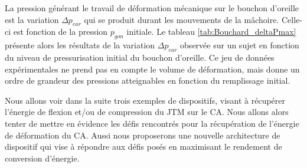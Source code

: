 La pression générant le travail de déformation mécanique sur le bouchon d'oreille est la variation $\Delta p_{ear}$ qui se produit durant les mouvements de la mâchoire. Celle-ci est fonction de la pression $p_{gon}$ initiale. Le tableau \ref{tab:Bouchard_deltaPmax} présente alors les résultats de la variation $\Delta p_{ear}$ observée sur un sujet en fonction du niveau de pressurisation initial du bouchon d'oreille. Ce jeu de données expérimentales ne prend pas en compte le volume de déformation, mais donne un ordre de grandeur des pressions atteignables en fonction du remplissage initial.
\begin{table}[!htbp]
	\centering
	\captionsetup{justification=centering}
        \caption{Variations de pression $\Delta p_{ear}$ maximales en fonction de la \mbox{pressurisation initiale $p_{gon}$}}
        \label{tab:Bouchard_deltaPmax}
\end{table} 

Nous allons voir dans la suite trois exemples de dispositifs, visant à récupérer l'énergie de flexion et/ou de compression du JTM sur le CA. Nous allons alors tenter de mettre en évidence les défis rencontrés pour la récupération de l'énergie de déformation du CA. Aussi nous proposerons une nouvelle architecture de dispositif qui vise à répondre aux défis posés en maximisant le rendement de conversion d'énergie.
